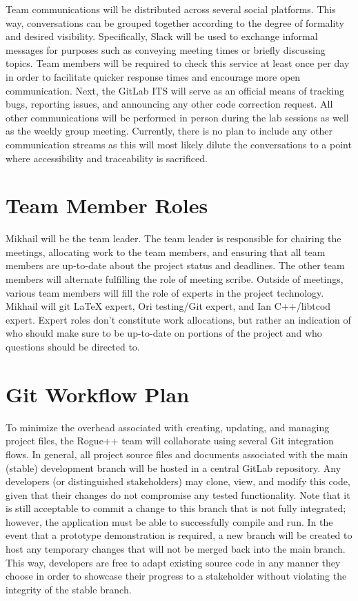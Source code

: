\documentclass{article}
\begin{document}
Team communications will be distributed across several social platforms. This way, conversations can be grouped together according to the degree of formality and desired visibility.  Specifically, Slack will be used to exchange informal messages for purposes such as conveying meeting times or briefly discussing topics.  Team members will be required to check this service at least once per day in order to facilitate quicker response times and encourage more open communication.  Next, the GitLab ITS will serve as an official means of tracking bugs, reporting issues, and announcing any other code correction request.  All other communications will be performed in person during the lab sessions as well as the weekly group meeting.  Currently, there is no plan to include any other communication streams as this will most likely dilute the conversations to a point where accessibility and traceability is sacrificed.

\section{Team Member Roles}

Mikhail will be the team leader. The team leader is responsible for chairing the meetings, allocating work to the team members, and ensuring that all team members are up-to-date about the project status and deadlines. The other team members will alternate fulfilling the role of meeting scribe. Outside of meetings, various team members will fill the role of experts in the project technology. Mikhail will git LaTeX expert, Ori testing/Git expert, and Ian C++/libtcod expert. Expert roles don't constitute work allocations, but rather an indication of who should make sure to be up-to-date on portions of the project and who questions should be directed to.

\section{Git Workflow Plan}

To minimize the overhead associated with creating, updating, and managing project files, the Rogue++ team will collaborate using several Git integration flows.  In general, all project source files and documents associated with the main (stable) development branch will be hosted in a central GitLab repository.  Any developers (or distinguished stakeholders) may clone, view, and modify this code, given that their changes do not compromise any tested functionality.  Note that it is still acceptable to commit a change to this branch that is not fully integrated; however, the application must be able to successfully compile and run.  In the event that a prototype demonstration is required, a new branch will be created to host any temporary changes that will not be merged back into the main branch.  This way, developers are free to adapt existing source code in any manner they choose in order to showcase their progress to a stakeholder without violating the integrity of the stable branch.\\
\end{document}
